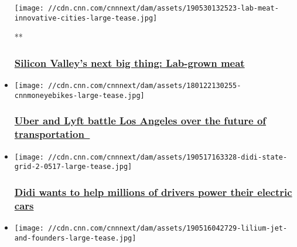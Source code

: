 \begin{itemize}
  \texttt{[image: //cdn.cnn.com/cnnnext/dam/assets/190530132523-lab-meat-innovative-cities-large-tease.jpg]}

  **

  \hypertarget{silicon-valleys-next-big-thing-lab-grown-meat}{%
  \subsubsection{\texorpdfstring{\href{/videos/business/2019/05/30/lab-meat-innovative-cities-vision.cnn-business}{Silicon
  Valley's next big thing: Lab-grown
  meat}}{Silicon Valley's next big thing: Lab-grown meat}}\label{silicon-valleys-next-big-thing-lab-grown-meat}}
\item
  \href{/2019/05/23/tech/uber-lyft-cities-data/index.html}{}

  \texttt{[image: //cdn.cnn.com/cnnnext/dam/assets/180122130255-cnnmoneyebikes-large-tease.jpg]}

  \hypertarget{uber-and-lyft-battle-los-angeles-over-the-future-of-transportation-}{%
  \subsubsection{\texorpdfstring{\href{/2019/05/23/tech/uber-lyft-cities-data/index.html}{Uber
  and Lyft battle Los Angeles over the future of
  transportation~}}{Uber and Lyft battle Los Angeles over the future of transportation~}}\label{uber-and-lyft-battle-los-angeles-over-the-future-of-transportation-}}
\item
  \href{/2019/05/23/tech/didi-chuxing-state-grid-china/index.html}{}

  \texttt{[image: //cdn.cnn.com/cnnnext/dam/assets/190517163328-didi-state-grid-2-0517-large-tease.jpg]}

  \hypertarget{didi-wants-to-help-millions-of-drivers-power-their-electric-cars-}{%
  \subsubsection{\texorpdfstring{\href{/2019/05/23/tech/didi-chuxing-state-grid-china/index.html}{Didi
  wants to help millions of drivers power their electric cars
  }}{Didi wants to help millions of drivers power their electric cars }}\label{didi-wants-to-help-millions-of-drivers-power-their-electric-cars-}}
\item
  \href{/2019/05/16/tech/lilium-flying-taxi-germany/index.html}{}

  \texttt{[image: //cdn.cnn.com/cnnnext/dam/assets/190516042729-lilium-jet-and-founders-large-tease.jpg]}


\end{itemize}
